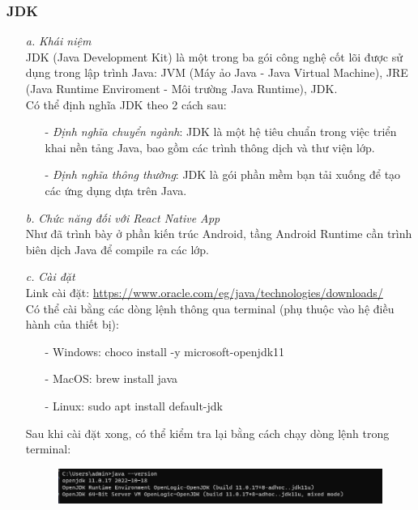 \subsubsection{JDK}
\begin{enumerate}
    \item[\textit{a.}] {\textit{Khái niệm}}\\
    JDK (Java Development Kit) là một trong ba gói công nghệ cốt lõi được sử dụng trong lập trình Java: JVM (Máy ảo Java - Java Virtual Machine), JRE (Java Runtime Enviroment - Môi trường Java Runtime), JDK.\\
    Có thể định nghĩa JDK theo 2 cách sau:
    \begin{enumerate}
        \item[-] {\textit{Định nghĩa chuyển ngành}}: JDK là một hệ tiêu chuẩn trong việc triển khai nền tảng Java, bao gồm các trình thông dịch và thư viện lớp.
        \item[-] {\textit{Định nghĩa thông thường}}: JDK là gói phần mềm bạn tải xuống để tạo các ứng dụng dựa trên Java.
    \end{enumerate}
    \item[\textit{b.}] {\textit{Chức năng đối với React Native App}}\\
    Như đã trình bày ở phần kiến trúc Android, tầng Android Runtime cần trình biên dịch Java để compile ra các lớp.
    \item[\textit{c.}] {\textit{Cài đặt}}\\
    Link cài đặt: \url{https://www.oracle.com/eg/java/technologies/downloads/}\\
    Có thể cài bằng các dòng lệnh thông qua terminal (phụ thuộc vào hệ điều hành của thiết bị):
    \begin{enumerate}
        \item[-] {Windows}: choco install -y microsoft-openjdk11
        \item[-] {MacOS}: brew install java
        \item[-] {Linux}: sudo apt install default-jdk
    \end{enumerate}
    Sau khi cài đặt xong, có thể kiểm tra lại bằng cách chạy dòng lệnh trong terminal:
    \begin{figure}[!ht]
        \centering
        \includegraphics[scale=0.5]{images/checkJDK.png}
    \end{figure}
\end{enumerate}
